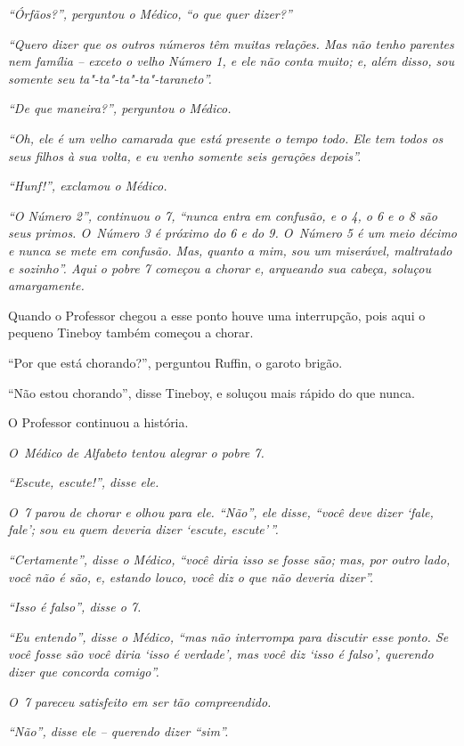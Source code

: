\emph{``Órfãos?'', perguntou o Médico, ``o que quer dizer?''}

\emph{``Quero dizer que os outros números têm muitas relações. Mas não
tenho parentes nem família -- exceto o velho Número 1, e ele não conta
muito; e, além disso, sou somente seu ta"-ta"-ta"-ta"-taraneto''.}

\emph{``De que maneira?'', perguntou o Médico.}

\emph{``Oh, ele é um velho camarada que está presente o tempo todo. Ele
tem todos os seus filhos à sua volta, e eu venho somente seis gerações
depois''.}

\emph{``Hunf!'', exclamou o Médico.}

\emph{``O Número 2'', continuou o 7, ``nunca entra em confusão, e o 4, o
6 e o 8 são seus primos. O~Número 3 é próximo do 6 e do 9. O~Número 5 é
um meio décimo e nunca se mete em confusão. Mas, quanto a mim, sou um
miserável, maltratado e sozinho''. Aqui o pobre 7 começou a chorar e,
arqueando sua cabeça, soluçou amargamente.}

Quando o Professor chegou a esse ponto houve uma interrupção, pois aqui
o pequeno Tineboy também começou a chorar.

``Por que está chorando?'', perguntou Ruffin, o garoto brigão.

``Não estou chorando'', disse Tineboy, e soluçou mais rápido do que
nunca.

O Professor continuou a história.

\emph{O~Médico de Alfabeto tentou alegrar o pobre 7.}

\emph{``Escute, escute!'', disse ele.}

\emph{O~7 parou de chorar e olhou para ele. ``Não'', ele disse, ``você
deve dizer `fale, fale'; sou eu quem deveria dizer `escute,
escute'\,''.}

\emph{``Certamente'', disse o Médico, ``você diria isso se fosse são;
mas, por outro lado, você não é são, e, estando louco, você diz o que
não deveria dizer''.}

\emph{``Isso é falso'', disse o 7.}

\emph{``Eu entendo'', disse o Médico, ``mas não interrompa para discutir
esse ponto. Se você fosse são você diria `isso é verdade', mas você diz
`isso é falso', querendo dizer que concorda comigo''.}

\emph{O~7 pareceu satisfeito em ser tão compreendido.}

\emph{``Não'', disse ele -- querendo dizer ``sim''.}

